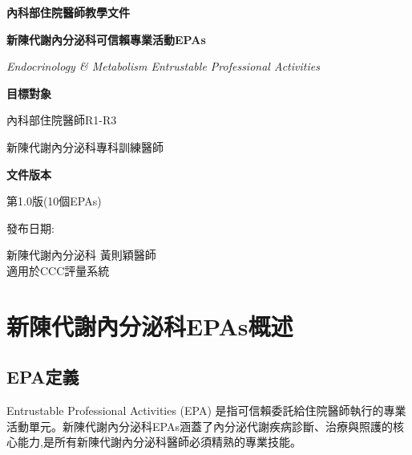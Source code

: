 \documentclass[12pt,a4paper]{article}
\newcommand{\mydate}{\DTMtoday}
\begin{document}
\begin{titlepage}
    \centering
    {\LARGE\textcolor{endo_blue}{\textbf{內科部住院醫師教學文件}}\par}
    \vspace{1cm}
    {\huge\bfseries 新陳代謝內分泌科可信賴專業活動EPAs\par}
    \vspace{0.5cm}
    {\Large\textcolor{endo_teal}{\textit{Endocrinology \& Metabolism Entrustable Professional Activities}}\par}
    \vspace{1cm}
    
    \begin{tcolorbox}[
        colback=endo_teal!5!white,
        colframe=endo_teal,
        width=0.8\textwidth,
        arc=10pt,
        boxrule=1pt
    ]
    \centering
    {\large\textbf{目標對象}\par}
    \vspace{0.3cm}
    內科部住院醫師R1-R3\par
    新陳代謝內分泌科專科訓練醫師\par
    \vspace{0.5cm}
    {\large\textbf{文件版本}\par}
    \vspace{0.3cm}
    第1.0版(10個EPAs)\par
    發布日期:\mydate\par
    \end{tcolorbox}

    \vfill
    
    {\large 新陳代謝內分泌科 黃則穎醫師 \\
    適用於CCC評量系統\par}
    
    \vspace{0.5cm}
\end{titlepage}

\newpage
\tableofcontents
\newpage

\section{新陳代謝內分泌科EPAs概述}

\subsection{EPA定義}
Entrustable Professional Activities (EPA) 是指可信賴委託給住院醫師執行的專業活動單元。新陳代謝內分泌科EPAs涵蓋了內分泌代謝疾病診斷、治療與照護的核心能力,是所有新陳代謝內分泌科醫師必須精熟的專業技能。
\end{document}
